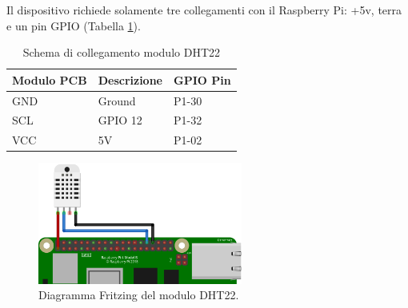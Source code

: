 Il dispositivo richiede solamente tre collegamenti con il Raspberry Pi: +5v, terra e un pin GPIO (Tabella \ref*{tb-dht22-conn-schema}).

\begin{table}[H]
    \centering
    \begin{tabular}{|l|l|l|}
    \hline
    \multicolumn{1}{|c|}{\textbf{Modulo PCB}} & \multicolumn{1}{c|}{\textbf{Descrizione}} & \multicolumn{1}{c|}{\textbf{GPIO Pin}} \\ \hline
    GND                                       & Ground                                    & P1-30                                  \\ \hline
    SCL                                       & GPIO 12                                   & P1-32                                  \\ \hline
    VCC                                       & 5V                                        & P1-02                                  \\ \hline
    \end{tabular}
    \caption{\label{tb-dht22-conn-schema}Schema di collegamento modulo DHT22}
\end{table}

\begin{figure}[H]
    \begin{center}
      \includegraphics[width=0.6\textwidth]{images/sensors/DHT22-fritzing.png}
    \end{center}
    \caption{\label{dht22-diagram}Diagramma Fritzing del modulo DHT22.}
\end{figure}

